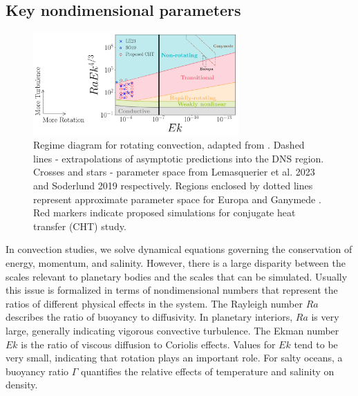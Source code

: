 \documentclass[12pt]{article}
\begin{document}
\subsection{Key nondimensional parameters}
\begin{figure}
	\begin{center}
		\includegraphics[width=0.7\textwidth]{figures/reg_diagram}
		\phantom{Lorem ipsum dolor sit amet}
	\end{center}
	\caption{Regime diagram for rotating convection, adapted from \citep{dL23,tG16}. Dashed lines - extrapolations of asymptotic predictions into the DNS region. Crosses and stars - parameter space from Lemasquerier et al. 2023\citep{dL23} and Soderlund 2019\citep{kS19} respectively. Regions enclosed by dotted lines represent approximate parameter space for Europa and Ganymede \citep{dL23,kS19}. Red markers indicate proposed simulations for conjugate heat transfer (CHT) study.
	}
	\label{f:reg_d}
\end{figure}
In convection studies, we solve dynamical equations governing the conservation of energy, momentum, and salinity. However, there is a large disparity between the scales relevant to planetary bodies and the scales that can be simulated. 
Usually this issue is formalized in terms of nondimensional numbers that represent the ratios of different physical effects in the system. %
The Rayleigh number $Ra$ describes the ratio of buoyancy to diffusivity. In planetary interiors, $Ra$ is very large, generally indicating vigorous convective turbulence.
The Ekman number $Ek$ is the ratio of viscous diffusion to Coriolis effects. Values for $Ek$ tend to be very small, indicating that rotation plays an important role.
For salty oceans, a buoyancy ratio $\Gamma$ quantifies the relative effects of temperature and salinity on density.
\end{document}
